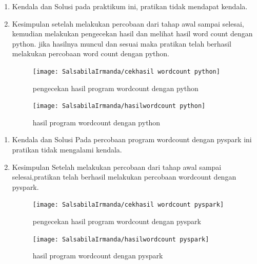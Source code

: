 \begin{enumerate}
\item Kendala dan Solusi
\newline pada praktikum ini, pratikan tidak mendapat kendala. 


\item Kesimpulan
\newline setelah melakukan percobaan dari tahap awal sampai selesai, kemudian melakukan pengecekan hasil dan melihat hasil word count dengan python. jika hasilnya muncul dan sesuai maka pratikan telah berhasil melakukan percobaan word count dengan python.
\begin{figure}[!ht]
\texttt{[image: SalsabilaIrmanda/cekhasil wordcount python]}
\caption{pengecekan hasil program wordcount dengan python}
\label{gam:cekhasil}
\end{figure}

\newpage
\begin{figure}[!ht]
\texttt{[image: SalsabilaIrmanda/hasilwordcount python]}
\caption{hasil program wordcount dengan python}
\label{gam:hasil}
\end{figure}
\end{enumerate}

\begin{enumerate}
\item Kendala dan Solusi
\newline Pada percobaan program wordcount dengan pyspark ini pratikan tidak mengalami kendala.

\item Kesimpulan
\newline Setelah melakukan percobaan dari tahap awal sampai selesai,pratikan telah berhasil melakukan percobaan wordcount dengan pyspark.
\begin{figure}[!ht]
\texttt{[image: SalsabilaIrmanda/cekhasil wordcount pyspark]}
\caption{pengecekan hasil program wordcount dengan pyspark}
\label{gam:cekhasil}
\end{figure}

\newpage
\begin{figure}[!ht]
\texttt{[image: SalsabilaIrmanda/hasilwordcount pyspark]}
\caption{hasil program wordcount dengan pyspark}
\label{gam:hasil}
\end{figure}
\end{enumerate}

